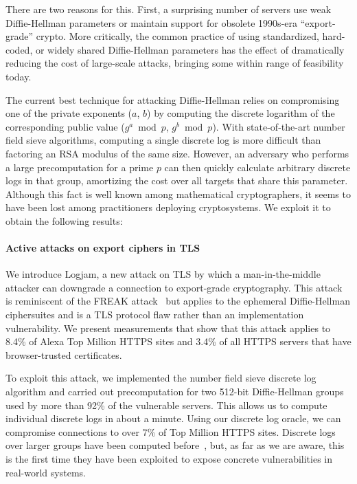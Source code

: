 There are two reasons for this. First, a surprising number of servers use
weak Diffie-Hellman parameters or maintain support for obsolete 1990s-era
``export-grade'' crypto. More critically, the common practice of using
standardized, hard-coded, or widely shared Diffie-Hellman parameters has the
effect of dramatically reducing the cost of large-scale attacks, bringing
some within range of feasibility today.

The current best technique for attacking Diffie-Hellman relies on
compromising one of the private exponents ($a$, $b$) by computing the
discrete logarithm of the corresponding public value ($g^a \bmod p$, $g^b
\bmod p$). With state-of-the-art number field sieve algorithms, computing a
single discrete log is more difficult than factoring an RSA modulus of the
same size. However, an adversary who performs a large precomputation for a
prime $p$ can then quickly calculate arbitrary discrete logs in that group,
amortizing the cost over all targets that share this parameter. Although this
fact is well known among mathematical cryptographers, it seems to have been
lost among practitioners deploying cryptosystems. We exploit it to
obtain the following results:

\paragraph{Active attacks on export ciphers in TLS}
We introduce Logjam, a new attack on TLS by which a man-in-the-middle
attacker can downgrade a connection to export-grade cryptography. This attack
is reminiscent of the FREAK attack~\cite{freak-attack-2015} but applies to
the ephemeral Diffie-Hellman ciphersuites and is a TLS protocol flaw rather
than an implementation vulnerability. We present measurements that show that
this attack applies to 8.4\% of Alexa Top Million HTTPS sites and 3.4\% of
all HTTPS servers that have browser-trusted certificates.

To exploit this attack, we implemented the number field sieve discrete log
algorithm and carried out precomputation for two 512-bit Diffie-Hellman
groups used by more than 92\% of the vulnerable servers. This allows us to
compute individual discrete logs in about a minute. Using our discrete log
oracle, we can compromise connections to over 7\% of Top Million HTTPS sites.
Discrete logs over larger groups have been computed before~\cite{dlp180},
but, as far as we are aware, this is the first time they have been exploited
to expose concrete vulnerabilities in real-world systems.


